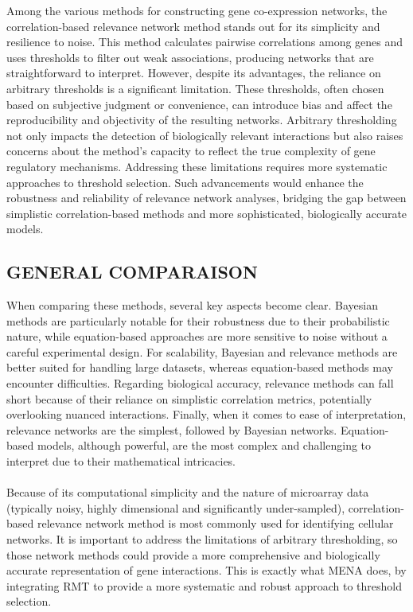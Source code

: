 Among the various methods for constructing gene co-expression networks, the correlation-based relevance network method stands out for its simplicity and resilience to noise\cite{butte_discovering_2000}.
This method calculates pairwise correlations among genes and uses thresholds to filter out weak associations, producing networks that are straightforward to interpret\cite{schmitt_elucidation_2004}.
However, despite its advantages, the reliance on arbitrary thresholds is a significant limitation.
These thresholds, often chosen based on subjective judgment or convenience, can introduce bias and affect the reproducibility and objectivity of the resulting networks\cite{oldham_conservation_2006}.
Arbitrary thresholding not only impacts the detection of biologically relevant interactions but also raises concerns about the method’s capacity to reflect the true complexity of gene regulatory mechanisms\cite{gardner_reverse-engineering_2005}.
Addressing these limitations requires more systematic approaches to threshold selection.
Such advancements would enhance the robustness and reliability of relevance network analyses, bridging the gap between simplistic correlation-based methods and more sophisticated, biologically accurate models.

\subsection{GENERAL COMPARAISON}\label{subsec:general-comparaison}

When comparing these methods, several key aspects become clear.
Bayesian methods are particularly notable for their robustness due to their probabilistic nature, while equation-based approaches are more sensitive to noise without a careful experimental design.
For scalability, Bayesian and relevance methods are better suited for handling large datasets, whereas equation-based methods may encounter difficulties.
Regarding biological accuracy, relevance methods can fall short because of their reliance on simplistic correlation metrics, potentially overlooking nuanced interactions.
Finally, when it comes to ease of interpretation, relevance networks are the simplest, followed by Bayesian networks.
Equation-based models, although powerful, are the most complex and challenging to interpret due to their mathematical intricacies.
\\\\
Because of its computational simplicity and the nature of microarray data (typically noisy, highly dimensional and significantly under-sampled)\cite{gardner_reverse-engineering_2005}, correlation-based relevance network method is most commonly used for identifying cellular networks.
It is important to address the limitations of arbitrary thresholding, so those network methods could provide a more comprehensive and biologically accurate representation of gene interactions.
This is exactly what MENA does, by integrating RMT to provide a more systematic and robust approach to threshold selection.